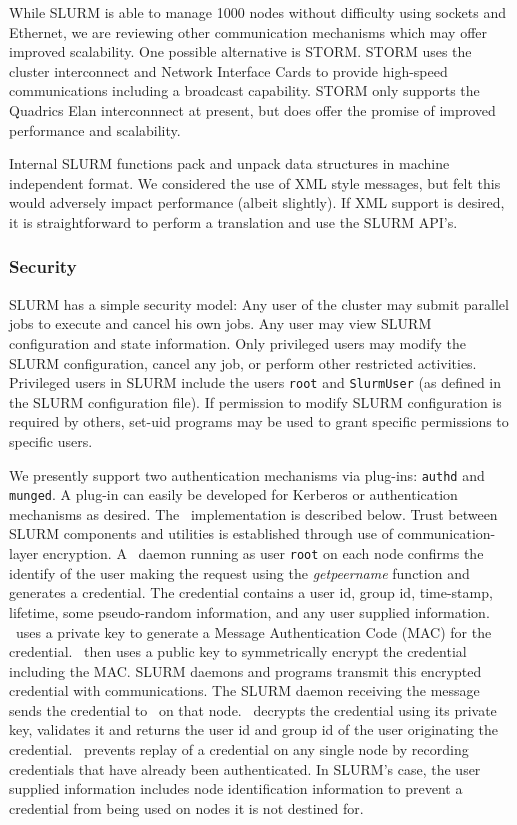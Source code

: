 While SLURM is able to manage 1000 nodes without difficulty using 
sockets and Ethernet, we are reviewing other communication 
mechanisms which may offer improved scalability. 
One possible alternative is STORM\cite{STORM2001}. 
STORM uses the cluster interconnect and Network Interface Cards to 
provide high-speed communications including a broadcast capability. 
STORM only supports the Quadrics Elan interconnnect at present, 
but does offer the promise of improved performance and scalability. 

Internal SLURM functions pack and unpack data structures in machine 
independent format. We considered the use of XML style messages, 
but felt this would adversely impact performance (albeit slightly). 
If XML support is desired, it is straightforward to perform a translation 
and use the SLURM API's.

\subsubsection{Security}

SLURM has a simple security model: 
Any user of the cluster may submit parallel jobs to execute and cancel
his own jobs.  Any user may view SLURM configuration and state
information.  
Only privileged users may modify the SLURM configuration,
cancel any job, or perform other restricted activities.  
Privileged users in SLURM include the users {\tt root} 
and {\tt SlurmUser} (as defined in the SLURM configuration file). 
If permission to modify SLURM configuration is 
required by others, set-uid programs may be used to grant specific
permissions to specific users.

We presently support two authentication mechanisms via plug-ins: 
{\tt authd}\cite{Authd2002} and {\tt munged}. 
A plug-in can easily be developed for Kerberos or authentication 
mechanisms as desired.
The \munged\ implementation is described below.
Trust between SLURM components and utilities is established through use
of communication-layer encryption.
A \munged\ daemon running as user {\tt root} on each node confirms the 
identify of the user making the request using the {\em getpeername} 
function and generates a credential. 
The credential contains a user id, 
group id, time-stamp, lifetime, some pseudo-random information, and 
any user supplied information. \munged\ uses a private key to 
generate a Message Authentication Code (MAC) for the credential.
\munged\ then uses a public key to symmetrically encrypt 
the credential including the MAC. 
SLURM daemons and programs transmit this encrypted 
credential with communications. The SLURM daemon receiving the message 
sends the credential to \munged\ on that node. 
\munged\ decrypts the credential using its private key, validates it 
and returns the user id and group id of the user originating the 
credential.
\munged\ prevents replay of a credential on any single node 
by recording credentials that have already been authenticated.
In SLURM's case, the user supplied information includes node 
identification information to prevent a credential from being 
used on nodes it is not destined for.

